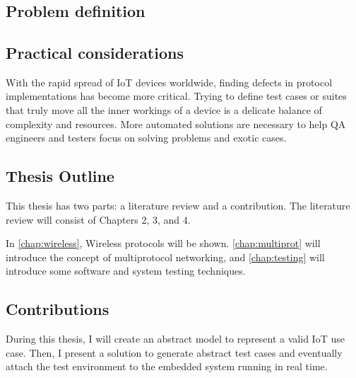 \chapter{\bevezetes}



\section{Problem definition}

%


\section{Practical considerations}

With the rapid spread of IoT devices worldwide, finding defects in protocol implementations has become more critical. Trying to define test cases or suites that truly move all the inner workings of a device is a delicate balance of complexity and resources. More automated solutions are necessary to help QA engineers and testers focus on solving problems and exotic cases.

\section{Thesis Outline}

This thesis has two parts: a literature review and a contribution. The literature review will consist of Chapters 2, 3, and 4.

In \autoref{chap:wireless}, Wireless protocols will be shown.
\autoref{chap:multiprot} will introduce the concept of multiprotocol networking, and \autoref{chap:testing} will introduce some software and system testing techniques.


\section{Contributions}
During this thesis, I will create an abstract model to represent a valid IoT use case. Then, I present a solution to generate abstract test cases and eventually attach the test environment to the embedded system running in real time.
